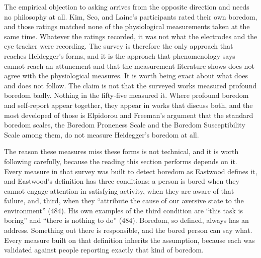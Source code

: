 The empirical objection to asking arrives from the opposite direction and needs no philosophy
at all. Kim, Seo, and Laine's participants rated their own boredom, and those ratings matched
none of the physiological measurements taken at the same time. Whatever the ratings recorded,
it was not what the electrodes and the eye tracker were recording. The survey is therefore the
only approach that reaches Heidegger's forms, and it is the approach that phenomenology says
cannot reach an attunement and that the measurement literature shows does not agree with the
physiological measures. It is worth being exact about what does and does not follow. The claim
is not that the surveyed works measured profound boredom badly. Nothing in the fifty-five
measured it. Where profound boredom and self-report appear together, they appear in works that
discuss both, and the most developed of those is Elpidorou and Freeman's argument that the
standard boredom scales, the Boredom Proneness Scale and the Boredom Susceptibility Scale among
them, do not measure Heidegger's boredom at all.

The reason these measures miss these forms is not technical, and it is worth following
carefully, because the reading this section performs depends on it. Every measure in that
survey was built to detect boredom as Eastwood defines it, and Eastwood's definition has three
conditions: a person is bored when they cannot engage attention in satisfying activity, when
they are aware of that failure, and, third, when they ``attribute the cause of our aversive state to the environment'' (484). His own examples of the
third condition are ``this task is boring'' and ``there is nothing to do'' (484). Boredom, so
defined, always has an address. Something out there is responsible, and the bored person can
say what. Every measure built on that definition inherits the assumption, because each was
validated against people reporting exactly that kind of boredom.

